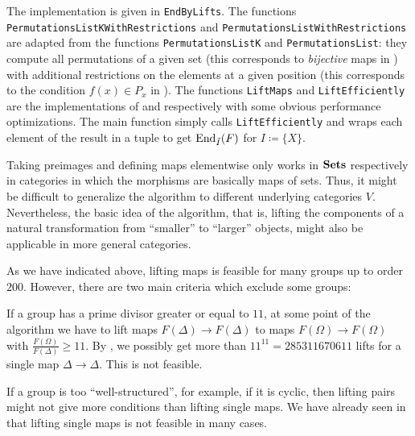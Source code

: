 \begin{rem}[Implementation]\label{rem:EndByLifts}
The implementation is given in \texttt{EndByLifts}. The functions \texttt{PermutationsListKWithRestrictions} and \texttt{PermutationsListWithRestrictions} are adapted from the \GAP{} functions \texttt{PermutationsListK} and \texttt{PermutationsList}: they compute all permutations of a given set (this corresponds to \emph{bijective} maps in ) with additional restrictions on the elements at a given position (this corresponds to the condition $f(x) \in P_x$ in ). The functions \texttt{LiftMaps} and \texttt{LiftEfficiently} are the implementations of  and  respectively with some obvious performance optimizations. The main function simply calls \texttt{LiftEfficiently} and wraps each element of the result in a tuple to get $\operatorname{End}_{\tilde I}(F)$ for $I \coloneqq \{X\}$.
\end{rem}

\begin{rem}
Taking preimages and defining maps elementwise only works in ${{\operatorname{\mathbf{Sets}}}}$ respectively in categories in which the morphisms are basically maps of sets. Thus, it might be difficult to generalize the algorithm to different underlying categories $V$. Nevertheless, the basic idea of the algorithm, that is, lifting the components of a natural transformation from ``smaller'' to ``larger'' objects, might also be applicable in more general categories.
\end{rem}

\begin{rem}
As we have indicated above, lifting maps is feasible for many groups up to order $200$. However, there are two main criteria which exclude some groups:

If a group has a prime divisor greater or equal to $11$, at some point of the algorithm we have to lift maps $F(\Delta) \to F(\Delta)$ to maps $F(\Omega) \to F(\Omega)$ with $\frac{F(\Omega)}{F(\Delta)} \geq 11$. By , we possibly get more than $11^{11} = 285311670611$ lifts for a single map $\Delta \to \Delta$. This is not feasible.

If a group is too ``well-structured'', for example, if it is cyclic, then lifting pairs might not give more conditions than lifting single maps. We have already seen in  that lifting single maps is not feasible in many cases.
\end{rem}

